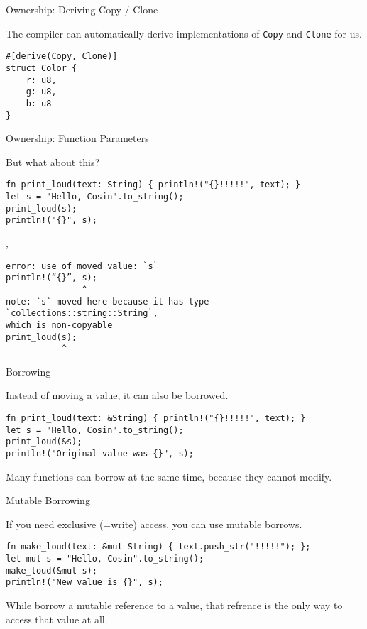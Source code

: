 
\begin{frame}[fragile]{Ownership: Deriving Copy / Clone}

The compiler can automatically derive implementations of \texttt{Copy} and
\texttt{Clone} for us.

\begin{verbatim}
#[derive(Copy, Clone)]
struct Color {
    r: u8,
    g: u8,
    b: u8
}
\end{verbatim}

\end{frame}


\begin{frame}[fragile]{Ownership: Function Parameters}

But what about this?

\begin{verbatim}
fn print_loud(text: String) { println!("{}!!!!!", text); }
let s = "Hello, Cosin".to_string();
print_loud(s);
println!("{}", s);
\end{verbatim}

\pause
\sep

\begin{verbatim}
error: use of moved value: `s`
println!(“{}”, s);
               ^
note: `s` moved here because it has type `collections::string::String`,
which is non-copyable
print_loud(s);
           ^
\end{verbatim}

\end{frame}


\begin{frame}[fragile]{Borrowing}

Instead of moving a value, it can also be borrowed.

\begin{verbatim}
fn print_loud(text: &String) { println!("{}!!!!!", text); }
let s = "Hello, Cosin".to_string();
print_loud(&s);
println!("Original value was {}", s);
\end{verbatim}

Many functions can borrow at the same time, because they cannot modify.

\end{frame}


\begin{frame}[fragile]{Mutable Borrowing}

If you need exclusive (=write) access, you can use mutable borrows.

\begin{verbatim}
fn make_loud(text: &mut String) { text.push_str("!!!!!"); };
let mut s = "Hello, Cosin".to_string();
make_loud(&mut s);
println!("New value is {}", s);
\end{verbatim}

While borrow a mutable reference to a value, that refrence is the only way to
access that value at all.
\end{frame}

